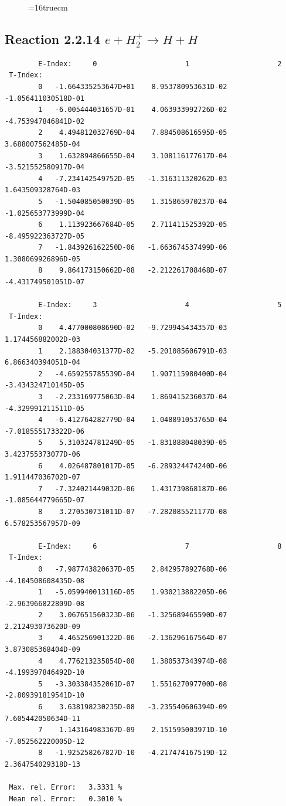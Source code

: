 \documentclass[12pt,dvips]{article}
\begin{document}
\begin{figure} \label{2.2.12}
\epsfxsize=16truecm
\end{figure}
\newpage



\subsection{
Reaction 2.2.14  $ e + H_2^+    \rightarrow H + H  $
}



\begin{small}\begin{verbatim}
        E-Index:     0                     1                     2
 T-Index:
        0   -1.664335253647D+01    8.953780953631D-02   -1.056411030518D-01
        1   -6.005444031657D-01    4.063933992726D-02   -4.753947846841D-02
        2    4.494812032769D-04    7.884508616595D-05    3.688007562485D-04
        3    1.632894866655D-04    3.108116177617D-04   -3.521552580917D-04
        4   -7.234142549752D-05   -1.316311320262D-03    1.643509328764D-03
        5   -1.504085050039D-05    1.315865970237D-04   -1.025653773999D-04
        6    1.113923667684D-05    2.711411525392D-05   -8.495922363727D-05
        7   -1.843926162250D-06   -1.663674537499D-06    1.308069926896D-05
        8    9.864173150662D-08   -2.212261708468D-07   -4.431749501051D-07

        E-Index:     3                     4                     5
 T-Index:
        0    4.477000808690D-02   -9.729945434357D-03    1.174456882002D-03
        1    2.188304031377D-02   -5.201085606791D-03    6.866340394051D-04
        2   -4.659255785539D-04    1.907115980400D-04   -3.434324710145D-05
        3   -2.233169775063D-04    1.869415236037D-04   -4.329991211511D-05
        4   -6.412764282779D-04    1.048891053765D-04   -7.018555173322D-06
        5    5.310324781249D-05   -1.831888048039D-05    3.423755373077D-06
        6    4.026487801017D-05   -6.289324474240D-06    1.911447036702D-07
        7   -7.324021449032D-06    1.431739868187D-06   -1.085644779665D-07
        8    3.270530731011D-07   -7.282085521177D-08    6.578253567957D-09

        E-Index:     6                     7                     8
 T-Index:
        0   -7.987743820637D-05    2.842957892768D-06   -4.104508608435D-08
        1   -5.059940013116D-05    1.930213882205D-06   -2.963966822809D-08
        2    3.067651560323D-06   -1.325689465590D-07    2.212493073620D-09
        3    4.465256901322D-06   -2.136296167564D-07    3.873085368404D-09
        4    4.776213235854D-08    1.380537343974D-08   -4.199397846492D-10
        5   -3.303384352061D-07    1.551627097700D-08   -2.809391819541D-10
        6    3.638198230235D-08   -3.235540606394D-09    7.605442050634D-11
        7    1.143164983367D-09    2.151595003971D-10   -7.052562220005D-12
        8   -1.925258267827D-10   -4.217474167519D-12    2.364754029318D-13

 Max. rel. Error:   3.3331 %
 Mean rel. Error:   0.3010 %


\end{verbatim}\end{small}
\end{document}

